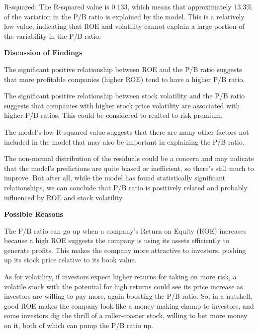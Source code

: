 R-squared: The R-squared value is 0.133, which means that approximately 13.3\% of the variation in the P/B ratio is explained by the model. This is a relatively low value, indicating that ROE and volatility cannot explain a large portion of the variability in the P/B ratio.


\noindent
\textbf{Discussion of Findings}

The significant positive relationship between ROE and the P/B ratio suggests that more profitable companies (higher ROE) tend to have a higher P/B ratio.

The significant positive relationship between stock volatility and the P/B ratio suggests that companies with higher stock price volatility are associated with higher P/B ratios. This could be considered to realted to risk premium.

The model's low R-squared value suggests that there are many other factors not included in the model that may also be important in explaining the P/B ratio.

The non-normal distribution of the residuals could be a concern and may indicate that the model's predictions are quite biased or inefficient, so there's still much to improve. But after all, while the model has found statistically significant relationships, we can conclude that P/B ratio is positively related and probably influenced by ROE and stock volatility.


\noindent
\textbf{Possible Reasons}

The P/B ratio can go up when a company's Return on Equity (ROE) increases because a high ROE suggests the company is using its assets efficiently to generate profits. This makes the company more attractive to investors, pushing up its stock price relative to its book value. 

As for volatility, if investors expect higher returns for taking on more risk, a volatile stock with the potential for high returns could see its price increase as investors are willing to pay more, again boosting the P/B ratio. So, in a nutshell, good ROE makes the company look like a money-making champ to investors, and some investors dig the thrill of a roller-coaster stock, willing to bet more money on it, both of which can pump the P/B ratio up.
